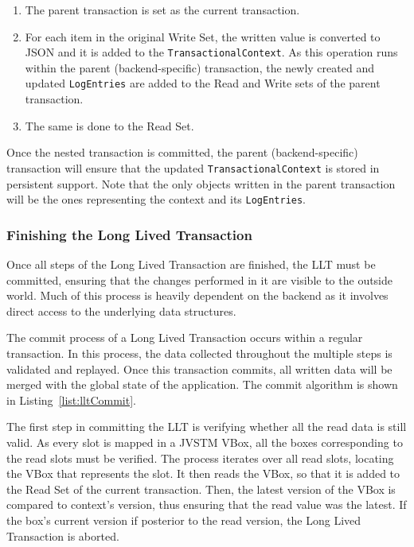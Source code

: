 \begin{enumerate}

\item The parent transaction is set as the current transaction.

\item For each item in the original Write Set, the written value is
  converted to JSON and it is added to the
  \texttt{TransactionalContext}. As this operation runs within the
  parent (backend-specific) transaction, the newly created and updated
  \texttt{LogEntries} are added to the Read and Write sets of the
  parent transaction.

\item The same is done to the Read Set.

\end{enumerate}

Once the nested transaction is committed, the parent
(backend-specific) transaction will ensure that the updated
\texttt{TransactionalContext} is stored in persistent support. Note
that the only objects written in the parent transaction will be the
ones representing the context and its \texttt{LogEntries}.

\subsubsection{Finishing the Long Lived Transaction}
\label{sec:jvstm-commit}

Once all steps of the Long Lived Transaction are finished, the LLT
must be committed, ensuring that the changes performed in it are
visible to the outside world. Much of this process is heavily
dependent on the backend as it involves direct access to the
underlying data structures.

The commit process of a Long Lived Transaction occurs within a regular
transaction. In this process, the data collected throughout the
multiple steps is validated and replayed. Once this transaction
commits, all written data will be merged with the global state of the
application. The commit algorithm is shown in Listing~\ref{list:lltCommit}.

The first step in committing the LLT is verifying whether all the read
data is still valid. As every slot is mapped in a JVSTM VBox, all the
boxes corresponding to the read slots must be verified. The process
iterates over all read slots, locating the VBox that represents the
slot. It then reads the VBox, so that it is added to the Read Set of
the current transaction. Then, the latest version of the VBox is
compared to context's version, thus ensuring that the read value was
the latest. If the box's current version if posterior to the read
version, the Long Lived Transaction is aborted.

